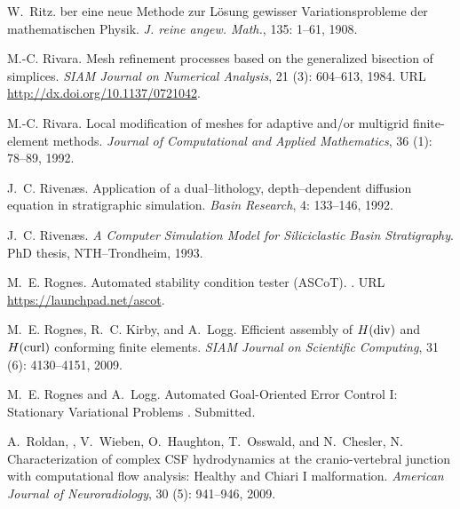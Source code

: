 \begin{thebibliography}{467}
W.~Ritz.
ber eine neue {M}ethode zur {L}\"osung gewisser
  {V}ariationsprobleme der mathematischen {P}hysik.
\newblock \emph{J. reine angew. Math.}, 135: 1--61, 1908.

M.-C. Rivara.
\newblock Mesh refinement processes based on the generalized bisection of
  simplices.
\newblock \emph{SIAM Journal on Numerical Analysis}, 21 (3):
  604--613, 1984.
\newblock URL \url{http://dx.doi.org/10.1137/0721042}.

M.-C. Rivara.
\newblock Local modification of meshes for adaptive and/or multigrid
  finite-element methods.
\newblock \emph{Journal of Computational and Applied Mathematics}, 36
  (1): 78--89, 1992.

J.~C. Riven{\ae}s.
\newblock Application of a dual--lithology, depth--dependent diffusion equation
  in stratigraphic simulation.
\newblock \emph{Basin Research}, 4: 133--146, 1992.

J.~C. Riven{\ae}s.
\newblock \emph{A Computer Simulation Model for Siliciclastic Basin
  Stratigraphy}.
\newblock PhD thesis, NTH--Trondheim, 1993.

M.~E. Rognes.
\newblock Automated stability condition tester ({ASCoT}).
.
\newblock URL \url{https://launchpad.net/ascot}.

M.~E. Rognes, R.~C. Kirby, and A.~Logg.
\newblock Efficient assembly of {$H({\rm div})$} and {$H({\rm curl})$}
  conforming finite elements.
\newblock \emph{SIAM Journal on Scientific Computing}, 31
  (6): 4130--4151, 2009.

M.~E. Rognes and A.~Logg.
\newblock Automated Goal-Oriented Error Control {I}: Stationary Variational Problems
.
\newblock Submitted.

A.~Roldan, , V.~Wieben, O.~Haughton, T.~Osswald, and N.~Chesler, N.
\newblock Characterization of complex {CSF} hydrodynamics at the
  cranio-vertebral junction with computational flow analysis: {H}ealthy and
  {C}hiari {I} malformation.
\newblock \emph{American Journal of Neuroradiology}, 30 (5):
  941--946, 2009.


\end{thebibliography}
